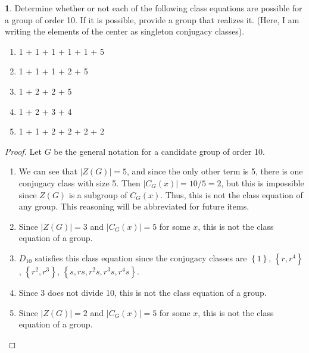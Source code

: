 \documentclass[12pt]{article}
\theoremstyle{definition}
\newtheorem{ex}{}
\begin{document}
\begin{ex}
	Determine whether or not each of the following class equations are possible for a group of order 10.
	If it is possible, provide a group that realizes it.
	(Here, I am writing the elements of the center as singleton conjugacy classes).
	\begin{enumerate}[label=(\alph*)]
		\item 1 + 1 + 1 + 1 + 1 + 5
		\item 1 + 1 + 1 + 2 + 5
		\item 1 + 2 + 2 + 5
		\item 1 + 2 + 3 + 4
		\item 1 + 1 + 2 + 2 + 2 + 2
	\end{enumerate}
\end{ex}
\begin{proof}
	Let $G$ be the general notation for a candidate group of order 10.
	\begin{enumerate}[label=(\alph*)]
		\item We can see that $|Z(G)| = 5$, and since the only other term is 5, there is one conjugacy class with size 5.
		      Then $|C_G(x)| = 10/5 = 2$, but this is impossible since $Z(G)$ is a subgroup of $C_G(x)$.
		      Thus, this is not the class equation of any group.
		      This reasoning will be abbreviated for future items.
		\item Since $|Z(G)| = 3$ and $|C_G(x)| = 5$ for some $x$, this is not the class equation of a group.
		\item $D_{10}$ satisfies this class equation since the conjugacy classes are $\left\lbrace 1 \right\rbrace$, $\left\lbrace r, r^4 \right\rbrace$, $\left\lbrace r^2, r^3 \right\rbrace$, $\left\lbrace s, rs, r^2s, r^3s, r^4s \right\rbrace$.
		\item Since 3 does not divide 10, this is not the class equation of a group.
		\item Since $|Z(G)| = 2$ and $|C_G(x)| = 5$ for some $x$, this is not the class equation of a group.
	\end{enumerate}
\end{proof}
\end{document}
